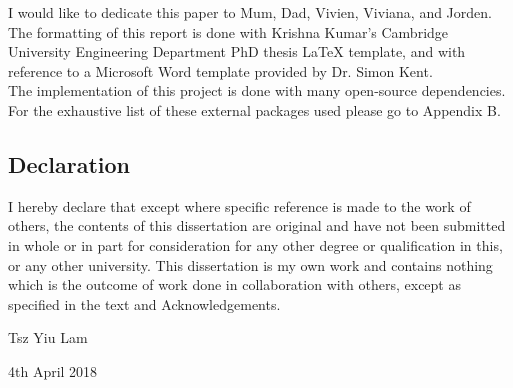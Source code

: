 
\begin{acknowledgements}      

I would like to dedicate this paper to Mum, Dad, Vivien, Viviana, and Jorden.\\

The formatting of this report is done with Krishna Kumar's Cambridge University Engineering Department PhD thesis 
LaTeX template, and with reference to a Microsoft Word template provided by Dr. Simon Kent.\\

The implementation of this project is done with many open-source dependencies.
For the exhaustive list of these external packages used please go to Appendix B.

\begin{center}
\section*{Declaration}
\end{center}

I hereby declare that except where specific reference is made to the work of 
others, the contents of this dissertation are original and have not been 
submitted in whole or in part for consideration for any other degree or 
qualification in this, or any other university. This dissertation is my own 
work and contains nothing which is the outcome of work done in collaboration 
with others, except as specified in the text and Acknowledgements.

\begin{flushright}
Tsz Yiu Lam

4th April 2018
\end{flushright}

\end{acknowledgements}
